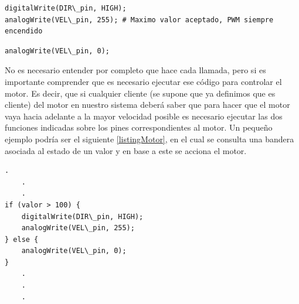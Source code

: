 \begin{lstlisting}[caption=Máxima velocidad giro horario]
digitalWrite(DIR\_pin, HIGH);
analogWrite(VEL\_pin, 255); # Maximo valor aceptado, PWM siempre encendido
\end{lstlisting}

\begin{lstlisting}[caption=Detenerce]
analogWrite(VEL\_pin, 0);
\end{lstlisting}

No es necesario entender por completo que hace cada llamada, pero si es importante comprender que es necesario ejecutar ese código para controlar el motor. Es decir, que si cualquier cliente (se supone que ya definimos que es cliente) del motor en nuestro sistema deberá saber que para hacer que el motor vaya hacia adelante a la mayor velocidad posible es necesario ejecutar las dos funciones indicadas sobre los pines correspondientes al motor. Un pequeño ejemplo podría ser el siguiente \ref{listingMotor}, en el cual se consulta una bandera asociada al estado de un valor y en base a este se acciona el motor.

\begin{lstlisting}[caption=Ejemplo uso del motor,label={listingMotor}]
    .
    .
    .
if (valor > 100) {
    digitalWrite(DIR\_pin, HIGH);
    analogWrite(VEL\_pin, 255);
} else {
    analogWrite(VEL\_pin, 0);
}
    .
    .
    .
\end{lstlisting}

